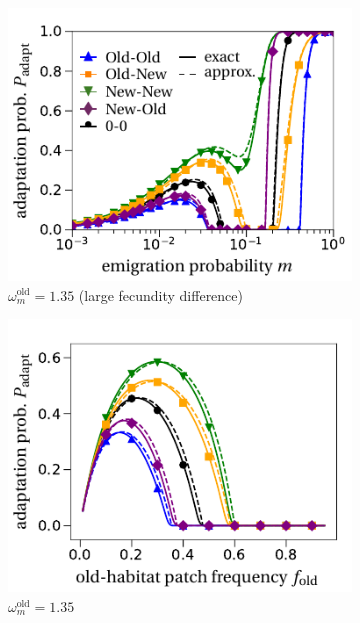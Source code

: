 \documentclass[11pt]{article}
\begin{document}
\begin{figure}[t!]
	\centering
		\begin{subfigure}{.5\textwidth}
 		 \centering
 		 \includegraphics[width=\linewidth]{fig3a.pdf}
  		\caption{$\omega^\text{old}_m=1.35$ (large fecundity difference)}
	\end{subfigure}%
	    \begin{subfigure}{.5\textwidth}
 		 \centering
 		 \includegraphics[width=\linewidth]{fig3b.pdf}
  		\caption{$\omega^\text{old}_m=1.35$}
	\end{subfigure}
	\begin{subfigure}{.5\textwidth}

\end{subfigure}
\end{figure}
\end{document}
